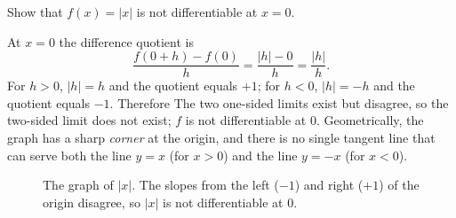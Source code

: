 \begin{workedexample}
\begin{example}\label{ex:abs-not-differentiable}
Show that \(f(x) = \lvert x \rvert\) is not differentiable at \(x = 0\).
\end{example}

\begin{solution}
At \(x = 0\) the difference quotient is
\[
\frac{f(0 + h) - f(0)}{h} = \frac{\lvert h \rvert - 0}{h} = \frac{\lvert h \rvert}{h}.
\]
For \(h > 0\), \(\lvert h \rvert = h\) and the quotient equals \(+1\); for \(h < 0\), \(\lvert h \rvert = -h\) and the quotient equals \(-1\). Therefore
The two one-sided limits exist but disagree, so the two-sided limit does not exist; \(f\) is not differentiable at \(0\). Geometrically, the graph has a sharp \emph{corner} at the origin, and there is no single tangent line that can serve both the line \(y = x\) (for \(x > 0\)) and the line \(y = -x\) (for \(x < 0\)).
\end{solution}
\end{workedexample}

\begin{figure}[H]
\centering
{}
\caption{The graph of \(\lvert x \rvert\). The slopes from the left (\(-1\)) and right (\(+1\)) of the origin disagree, so \(\lvert x \rvert\) is not differentiable at \(0\).}
\label{fig:abs-corner}
\end{figure}

